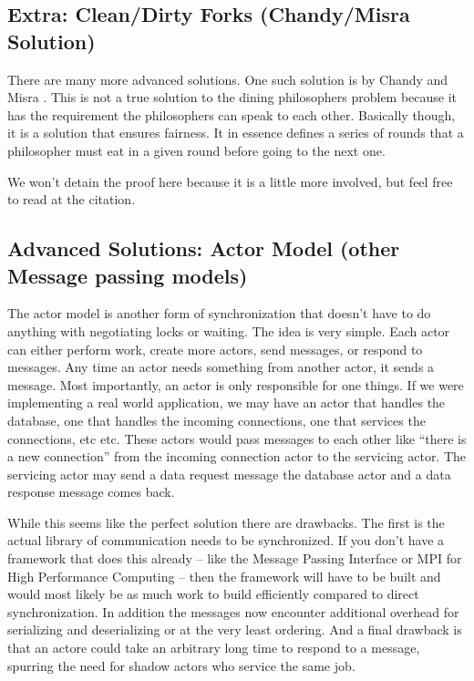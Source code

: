 \subsection{Extra: Clean/Dirty Forks (Chandy/Misra Solution)}

There are many more advanced solutions. One such solution is by Chandy and Misra \cite{Chandy:1984:DPP:1780.1804}. This is not a true solution to the dining philosophers problem because it has the requirement the philosophers can speak to each other. Basically though, it is a solution that ensures fairness. It in essence defines a series of rounds that a philosopher must eat in a given round before going to the next one.

We won't detain the proof here because it is a little more involved, but feel free to read at the citation.

\subsection{Advanced Solutions: Actor Model (other Message passing models)}

The actor model is another form of synchronization that doesn't have to do anything with negotiating locks or waiting. The idea is very simple. Each actor can either perform work, create more actors, send messages, or respond to messages. Any time an actor needs something from another actor, it sends a message. Most importantly, an actor is only responsible for one things.
If we were implementing a real world application, we may have an actor that handles the database, one that handles the incoming connections, one that services the connections, etc etc.
These actors would pass messages to each other like ``there is a new connection'' from the incoming connection actor to the servicing actor.
The servicing actor may send a data request message the database actor and a data response message comes back.

While this seems like the perfect solution there are drawbacks.
The first is the actual library of communication needs to be synchronized.
If you don't have a framework that does this already -- like the Message Passing Interface or MPI for High Performance Computing -- then the framework will have to be built and would most likely be as much work to build efficiently compared to direct synchronization.
In addition the messages now encounter additional overhead for serializing and deserializing or at the very least ordering.
And a final drawback is that an actore could take an arbitrary long time to respond to a message, spurring the need for shadow actors who service the same job.

